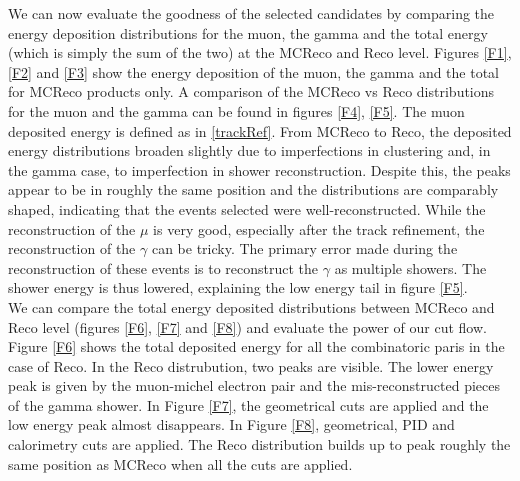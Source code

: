 \documentclass[a4paper, 10pt]{article}
\begin{document}
We can now evaluate the goodness of the selected candidates by comparing the energy deposition distributions for the muon, the gamma and the total energy (which is simply the sum of the two) at the MCReco and Reco level. Figures \ref{F1}, \ref{F2} and \ref{F3} show the energy deposition of the muon, the gamma and the total for MCReco products only. A comparison of the MCReco vs Reco distributions for the muon and the gamma can be found in figures \ref{F4}, \ref{F5}. The muon deposited energy is defined as in \ref{trackRef}. From MCReco to Reco, the deposited energy distributions broaden slightly due to imperfections in clustering and, in the gamma case, to imperfection in shower reconstruction. Despite this, the peaks appear to be in roughly the same position and the distributions are comparably shaped, indicating that the events selected were well-reconstructed.  While the reconstruction of the $\mu$ is very good, especially after the track refinement, the reconstruction of the  $\gamma$ can be tricky. The primary error made during the reconstruction of these events is to reconstruct the $\gamma$ as multiple showers. The shower energy is thus lowered, explaining the low energy tail in figure \ref{F5}.\\

We can compare the total energy deposited distributions between MCReco and Reco level (figures \ref{F6}, \ref{F7} and \ref{F8}) and evaluate the power of our cut flow. Figure \ref{F6} shows the total deposited energy for all the combinatoric paris in the case of Reco. In the Reco distrubution, two peaks are visible. The lower energy peak is given by the muon-michel electron pair and the mis-reconstructed pieces of the gamma shower.
In Figure \ref{F7}, the geometrical cuts are applied and the low energy peak almost disappears. In Figure \ref{F8}, geometrical, PID and calorimetry cuts are applied. The Reco distribution builds up to peak roughly the same position as MCReco when all the cuts are applied.
\end{document}
